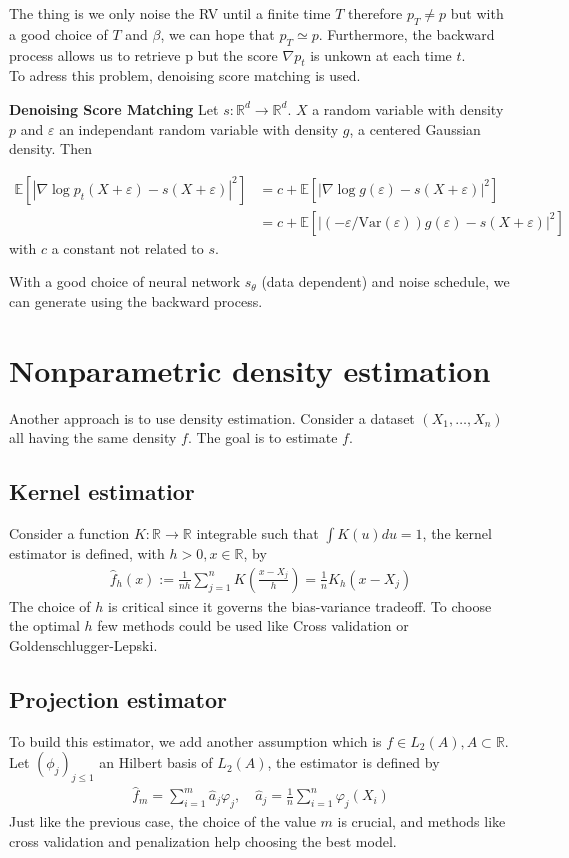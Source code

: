 \documentclass{article}
\begin{document}
The thing is we only noise the RV until a finite time \(T\) therefore \(p_T\not= p\) but with a good choice of \(T\) and \(\beta\), we can hope that \(p_T\simeq p\). Furthermore, the backward process allows us to retrieve p but the score \(\nabla p_t\) is unkown at each time \(t\). \\
To adress this problem, denoising score matching is used.  

\bigskip
\textbf{Denoising Score Matching} \newline
Let \(s:\mathbb{R}^d\rightarrow\mathbb{R}^d\). \(X\) a random variable with density \(p\) and \(\varepsilon\) an independant random variable with density \(g\), a centered Gaussian density. Then 

\begin{align}
    \mathbb{E}[|\nabla \log p_t (X+\varepsilon)-s(X+\varepsilon)|^2]&=c+\mathbb{E}[|\nabla \log g(\varepsilon)-s(X+\varepsilon)|^2]\\
    &=c+\mathbb{E}[|(-\varepsilon/\text{Var} (\varepsilon))g(\varepsilon)-s(X+\varepsilon)|^2]
\end{align}
with \(c\) a constant not related to \(s\).

With a good choice of neural network \(s_\theta\) (data dependent) and noise schedule, we can generate using the backward process.


\section{Nonparametric density estimation}
Another approach is to use density estimation. Consider a dataset \((X_1,\ldots,X_n)\) all having the same density \(f\). The goal is to estimate \(f\). 

\subsection{Kernel estimatior}
Consider a function \(K:\mathbb{R}\rightarrow\mathbb{R}\) integrable such that \(\int K(u)du=1\), the kernel estimator is defined, with \(h>0, x\in\mathbb{R}\), by 
\begin{align}
\hat{f}_h(x):=\frac{1}{nh}\sum_{j=1}^n K(\frac{x-X_j}{h})=\frac{1}{n}K_h(x-X_j)
\end{align}
The choice of \(h\) is critical since it governs the bias-variance tradeoff. To choose the optimal \(h\) few methods could be used like Cross validation or Goldenschlugger-Lepski.

\subsection{Projection estimator}
To build this estimator, we add another assumption which is \(f\in L_2(A), A\subset \mathbb{R}\). \\
Let \((\phi_j)_{j\le 1}\) an Hilbert basis of \(L_2(A)\), the estimator is defined by 
\begin{align}
    \hat{f}_m=\sum_{i=1}^m\hat{a}_j\varphi_j, \quad \hat{a}_j=\frac{1}{n}\sum_{i=1}^n \varphi_j(X_i)
\end{align}
Just like the previous case, the choice of the value \(m\) is crucial, and methods like cross validation and penalization help choosing the best model.

\nocite{Coste_2025}
\nocite{lipman2024flowmatchingguidecode}
\nocite{strasman2025analysisnoiseschedulescorebased}


\end{document}
